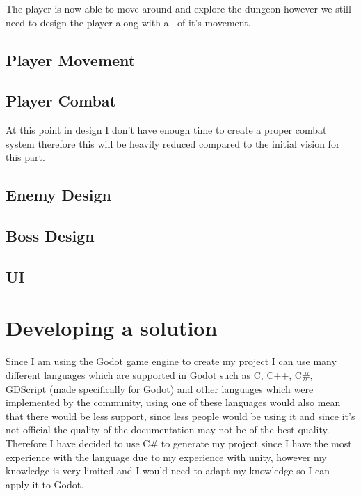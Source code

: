 \documentclass{article}
\begin{document}
The player is now able to move around and explore the dungeon however we still need to design the player along with all of it's movement.

\subsection{Player Movement}

\subsection{Player Combat}
At this point in design I don't have enough time to create a proper combat system therefore this will be heavily reduced compared to the initial vision for this part.

\subsection{Enemy Design}

\subsection{Boss Design}

\subsection{UI}

\section{Developing a solution}
Since I am using the Godot game engine to create my project I can use many different languages which are supported in Godot such as C, C++, C\#, GDScript (made specifically for Godot) and other languages which were implemented by the community, using one of these languages would also mean that there would be less support, since less people would be using it and since it's not official the quality of the documentation may not be of the best quality. Therefore I have decided to use C\# to generate my project since I have the most experience with the language due to my experience with unity, however my knowledge is very limited and I would need to adapt my knowledge so I can apply it to Godot. 
\end{document}

